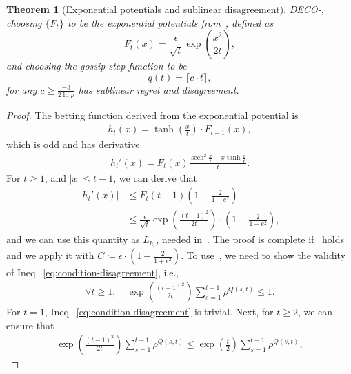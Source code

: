 \documentclass[journal]{IEEEtran} %
\newtheorem{theorem}{Theorem}
\newcommand{\br}[1]{\left(#1\right)}
\DeclareMathOperator{\sech}{sech}
\newcommand{\algname}{{DECO}\xspace}
\begin{document}
\begin{theorem}[Exponential potentials and sublinear disagreement]\label{thm:exponential-disagreement}
    \algname{}-, choosing $\{F_t\}$ to be the exponential potentials from~, defined as
    \begin{equation}
        F_t(x) = \frac{\epsilon}{\sqrt{t}} \exp\br{\frac{x^2}{2t}},
    \end{equation}
    and choosing the gossip step function to be
    \begin{equation}
        q(t) = \lceil c \cdot t \rceil,
    \end{equation}
    for any $c \geq \frac{-3}{2\ln \rho}$ has sublinear regret and disagreement.
\end{theorem}
\begin{proof}
    The betting function derived from the exponential potential is
    \begin{align}
        h_t(x) = \tanh \br{\frac{x}{t}} \cdot F_{t-1}(x),
    \end{align}
    which is odd and has derivative
    \begin{align}
        h_t'(x) = F_t(x) \frac{\sech^2{\frac{x}{t}} + x \tanh{\frac{x}{t}}}{t}.
    \end{align}
    For $t\geq 1$, and $|x| \leq t-1$, we can derive that
    \begin{align}
        |h_t'(x)| & \leq  F_t(t-1) \br{1 - \frac{2}{1 + e^2}}                                                        \\
                  & \leq \frac{\epsilon}{\sqrt{t}} \exp \br{\frac{\br{t-1}^2}{2t}} \cdot \br{1 - \frac{2}{1 + e^2}},
    \end{align}
    and we can use this quantity as $L_{h_t}$, needed in~.
    The proof is complete if~ holds and we apply it with $C \coloneqq \epsilon \cdot \br{1 - \frac{2}{1 + e^2}}$.
    To use~, we need to show the validity of Ineq.~\eqref{eq:condition-disagreement}, i.e.,
    \begin{align*}
        \forall t \geq 1, \quad \exp \br{\frac{\br{t-1}^2}{2t}} \sum_{s=1}^{t-1} \rho^{Q(s,t)} \leq 1.
    \end{align*}
    For $t=1$, Ineq.~\eqref{eq:condition-disagreement} is trivial.
    Next, for $t \geq 2$, we can ensure that
    \begin{align*}
        \exp \br{\frac{\br{t-1}^2}{2t}} \sum_{s=1}^{t-1} \rho^{Q(s,t)} \leq \exp \br{\frac{t}{2}} \sum_{s=1}^{t-1} \rho^{Q(s,t)},

\end{align*}
\end{proof}
\end{document}
